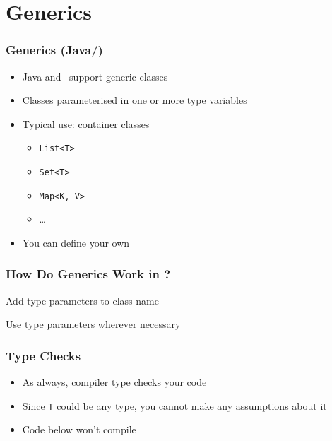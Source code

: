 \section{Generics}

\frame{\tableofcontents[currentsection]}

\begin{frame}
  \frametitle{Generics (Java/\csharp)}
  \begin{itemize}
    \item Java and \csharp\ support generic classes
    \item Classes parameterised in one or more type variables
    \item Typical use: container classes
          \begin{itemize}
            \item \texttt{List<T>}
            \item \texttt{Set<T>}
            \item \texttt{Map<K, V>}
            \item \dots
          \end{itemize}
    \item You can define your own
  \end{itemize}
\end{frame}

\begin{frame}
  \frametitle{How Do Generics Work in \csharp?}
  \vskip-10mm
  \begin{overprint}
    \begin{center}
      Add type parameters to class name
    \end{center}

    \begin{center} 
      Use type parameters wherever necessary
    \end{center}
  \end{overprint}
\end{frame}

\begin{frame}
  \frametitle{Type Checks}
  \begin{itemize}
    \item As always, compiler type checks your code
    \item Since \texttt{T} could be any type, you cannot make any assumptions about it
    \item Code below won't compile
  \end{itemize}
\end{frame}

